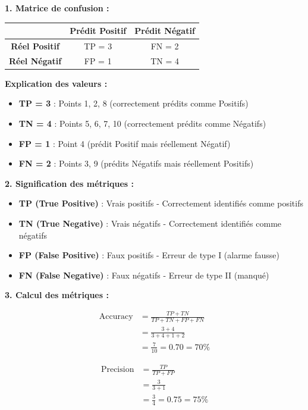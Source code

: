 \documentclass[11pt,a4paper]{article}
\begin{document}
\begin{solutionbox}
\textbf{1. Matrice de confusion :}

\begin{center}
\begin{tabular}{|c|c|c|}
\hline
 & \textbf{Prédit Positif} & \textbf{Prédit Négatif} \\
\hline
\textbf{Réel Positif} & TP = 3 & FN = 2 \\
\hline
\textbf{Réel Négatif} & FP = 1 & TN = 4 \\
\hline
\end{tabular}
\end{center}

\textbf{Explication des valeurs :}
\begin{itemize}
    \item \textbf{TP = 3} : Points 1, 2, 8 (correctement prédits comme Positifs)
    \item \textbf{TN = 4} : Points 5, 6, 7, 10 (correctement prédits comme Négatifs)
    \item \textbf{FP = 1} : Point 4 (prédit Positif mais réellement Négatif)
    \item \textbf{FN = 2} : Points 3, 9 (prédits Négatifs mais réellement Positifs)
\end{itemize}

\textbf{2. Signification des métriques :}
\begin{itemize}
    \item \textbf{TP (True Positive)} : Vrais positifs - Correctement identifiés comme positifs
    \item \textbf{TN (True Negative)} : Vrais négatifs - Correctement identifiés comme négatifs
    \item \textbf{FP (False Positive)} : Faux positifs - Erreur de type I (alarme fausse)
    \item \textbf{FN (False Negative)} : Faux négatifs - Erreur de type II (manqué)
\end{itemize}

\textbf{3. Calcul des métriques :}

\begin{align*}
\text{Accuracy} &= \frac{TP + TN}{TP + TN + FP + FN} \\
               &= \frac{3 + 4}{3 + 4 + 1 + 2} \\
               &= \frac{7}{10} = 0.70 = 70\%
\end{align*}

\begin{align*}
\text{Precision} &= \frac{TP}{TP + FP} \\
                 &= \frac{3}{3 + 1} \\
                 &= \frac{3}{4} = 0.75 = 75\%
\end{align*}


\end{solutionbox}
\end{document}
